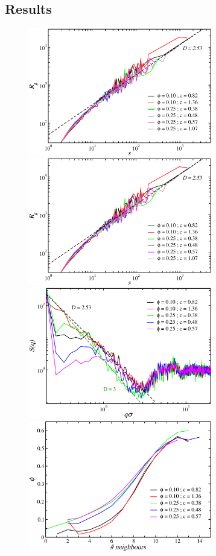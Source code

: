 \documentclass[twocolumn,showpacs,amsmath,amssymb,pre,superscriptaddress]{revtex4}
\begin{document}
\subsection*{Results}


\begin{figure}[!t]
 \centering
 \includegraphics[width=8cm]{./oldfig/fig1b.pdf}
 \includegraphics[width=8cm]{./oldfig/fig1b.pdf}
 \includegraphics[width=8cm]{./oldfig/fig3c}
 \includegraphics[width=8cm]{./oldfig/fig3b}

\end{figure}
\end{document}
